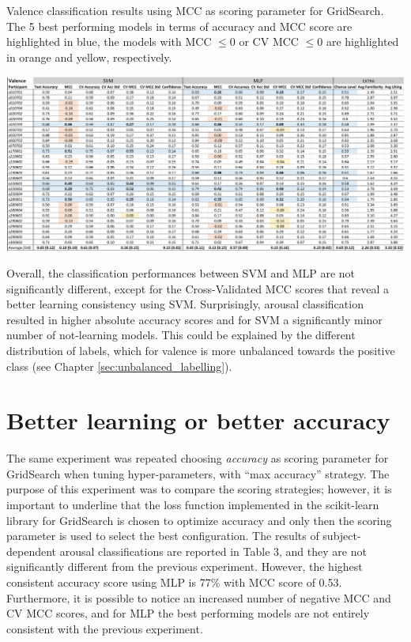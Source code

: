 \begin{table}[h!]
  \caption{Valence classification results using MCC as scoring parameter for GridSearch. The 5 best performing models in terms of accuracy and MCC score are highlighted in blue, the models with MCC \(\leq 0\) or CV MCC \(\leq 0\) are highlighted in orange and yellow, respectively.}
  \label{tbl:valence_results}
  \includegraphics[width=\linewidth]{img/results/valence_results.png}
\end{table}

Overall, the classification performances between \ac{SVM} and \ac{MLP} are not significantly different, except for the Cross-Validated MCC scores that reveal a better learning consistency using \ac{SVM}. Surprisingly, arousal classification resulted in higher absolute accuracy scores and for \ac{SVM} a significantly minor number of not-learning models. This could be explained by the different distribution of labels, which for valence is more unbalanced towards the positive class (see Chapter \ref{sec:unbalanced_labelling}).

\section{Better learning or better accuracy}
\label{sec:better_learning_accuracy}
The same experiment was repeated choosing \emph{accuracy} as scoring parameter for GridSearch when tuning hyper-parameters, with “max accuracy” strategy. The purpose of this experiment was to compare the scoring strategies; however, it is important to underline that the loss function implemented in the scikit-learn library for GridSearch is chosen to optimize accuracy and only then the scoring parameter is used to select the best configuration. The results of subject-dependent arousal classifications are reported in Table 3, and they are not significantly different from the previous experiment. However, the highest consistent accuracy score using MLP is 77\% with MCC score of 0.53. Furthermore, it is possible to notice an increased number of negative MCC and CV MCC scores, and for MLP the best performing models are not entirely consistent with the previous experiment.

